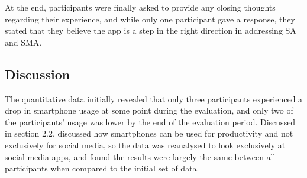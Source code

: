 \documentclass[12pt]{article}
\begin{document}





At the end, participants were finally asked to
provide any closing thoughts regarding their experience, and while only one participant gave a response, they stated that they believe the app is a step in the 
right direction in addressing SA and SMA.


\subsection{Discussion}


The quantitative data initially revealed that only three participants experienced a drop in smartphone usage at some point during the evaluation, and only two 
of the participants' usage was lower by the end of the evaluation period. Discussed in section 2.2, discussed how smartphones can be used 
for productivity and not exclusively for social media, so the data was reanalysed to look exclusively at social media apps, and found the results were largely the same between all participants when compared to
the initial set of data.\newline
\end{document}
